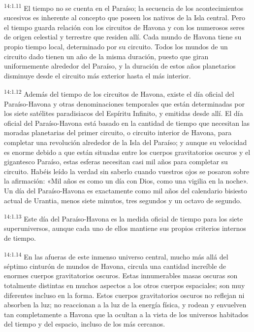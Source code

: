 \par
\textsuperscript{14:1.11} El tiempo no se cuenta en el Paraíso; la secuencia de los acontecimientos sucesivos es inherente al concepto que poseen los nativos de la Isla central. Pero el tiempo guarda relación con los circuitos de Havona y con los numerosos seres de origen celestial y terrestre que residen allí. Cada mundo de Havona tiene su propio tiempo local, determinado por su circuito. Todos los mundos de un circuito dado tienen un año de la misma duración, puesto que giran uniformemente alrededor del Paraíso, y la duración de estos años planetarios disminuye desde el circuito más exterior hasta el más interior.

\par
\textsuperscript{14:1.12} Además del tiempo de los circuitos de Havona, existe el día oficial del Paraíso-Havona y otras denominaciones temporales que están determinadas por los siete satélites paradisiacos del Espíritu Infinito, y emitidas desde allí. El día oficial del Paraíso-Havona está basado en la cantidad de tiempo que necesitan las moradas planetarias del primer circuito, o circuito interior de Havona, para completar una revolución alrededor de la Isla del Paraíso; y aunque su velocidad es enorme debido a que están situadas entre los cuerpos gravitatorios oscuros y el gigantesco Paraíso, estas esferas necesitan casi mil años para completar su circuito. Habéis leído la verdad sin saberlo cuando vuestros ojos se posaron sobre la afirmación: «Mil años es como un día con Dios, como una vigilia en la noche». Un día del Paraíso-Havona es exactamente como mil años del calendario bisiesto actual de Urantia, menos siete minutos, tres segundos y un octavo de segundo.

\par
\textsuperscript{14:1.13} Este día del Paraíso-Havona es la medida oficial de tiempo para los siete superuniversos, aunque cada uno de ellos mantiene sus propios criterios internos de tiempo.

\par
\textsuperscript{14:1.14} En las afueras de este inmenso universo central, mucho más allá del séptimo cinturón de mundos de Havona, circula una cantidad increíble de enormes cuerpos gravitatorios oscuros. Estas innumerables masas oscuras son totalmente distintas en muchos aspectos a los otros cuerpos espaciales; son muy diferentes incluso en la forma. Estos cuerpos gravitatorios oscuros no reflejan ni absorben la luz; no reaccionan a la luz de la energía física, y rodean y envuelven tan completamente a Havona que la ocultan a la vista de los universos habitados del tiempo y del espacio, incluso de los más cercanos.

